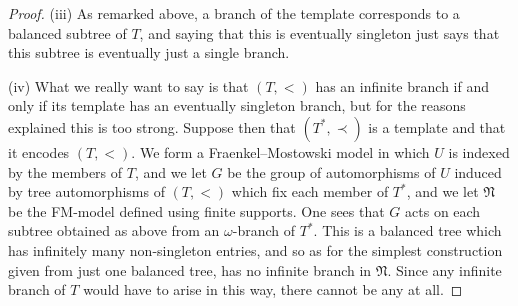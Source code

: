 \documentclass[10pt,a4paper]{amsart}
\begin{document}
\begin{proof}
(iii) As remarked above, a branch of the template corresponds to a balanced subtree of $T$, and saying that this is eventually singleton
just says that this subtree is eventually just a single branch.

(iv) What we really want to say is that $(T,<)$ has an infinite branch if and only if its template has an eventually singleton branch,
but for the reasons explained this is too strong. Suppose then that $(T^*, \prec)$ is a template and that it encodes $(T, <)$. We form
a Fraenkel--Mostowski model in which $U$ is indexed by the members of $T$, and we let $G$ be the group of automorphisms of $U$ induced by
tree automorphisms of $(T,<)$ which fix each member of $T^*$, and we let $\mathfrak N$ be the FM-model defined using finite supports.
One sees that $G$ acts on each subtree obtained as above from an $\omega$-branch of $T^*$. This is a balanced tree which has
infinitely many non-singleton entries, and so as for the simplest construction given from just one balanced tree, has no infinite
branch in $\mathfrak N$. Since any infinite branch of $T$ would have to arise in this way, there cannot be any at all. \end{proof}
\end{document}
